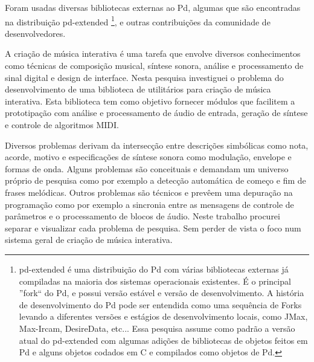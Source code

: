 \documentclass{ppgmus}
\begin{document}
Foram usadas diversas bibliotecas externas ao Pd, algumas que são encontradas na distribuição pd-extended
\footnote{pd-extended é uma distribuição do Pd com várias bibliotecas externas já compiladas na maioria dos
sistemas operacionais existentes. É o principal ''fork`` do Pd, e possui versão estável e versão de desenvolvimento.
A história de desenvolvimento do Pd pode ser entendida como uma sequência de Forks levando a diferentes versões 
e estágios de desenvolvimento locais, como JMax, Max-Ircam, DesireData, etc... Essa pesquisa assume como padrão
a versão atual do pd-extended com algumas adições de bibliotecas de objetos feitos em Pd e alguns objetos codados
em C e compilados como objetos de Pd.}, 
e outras contribuições da comunidade de desenvolvedores.







A criação de música interativa é uma tarefa que envolve diversos 
conhecimentos como técnicas de composição musical, síntese sonora,
análise e processamento de sinal digital e design de interface.
Nesta pesquisa investiguei o problema do desenvolvimento de uma biblioteca
de utilitários para criação de música interativa. Esta biblioteca tem
como objetivo fornecer módulos que facilitem a prototipação com análise
e processamento de áudio de entrada, geração de síntese e controle de algoritmos MIDI.


Diversos problemas derivam da intersecção entre descrições simbólicas
como nota, acorde, motivo e 
especificações de síntese sonora como modulação, envelope e formas de onda.
Alguns problemas são conceituais e demandam um universo próprio de 
pesquisa como por exemplo a detecção automática de começo e fim de
frases melódicas. Outros problemas são técnicos e prevêem uma depuração
na programação como por exemplo a sincronia entre as mensagens de controle de parâmetros
e o processamento de blocos de áudio. 
Neste trabalho procurei separar e visualizar cada problema de pesquisa. Sem perder de vista o foco
num sistema geral de criação de música interativa.
\end{document}
